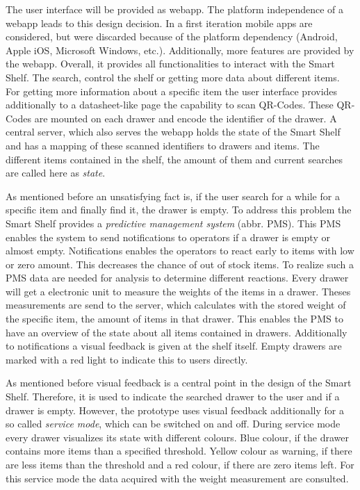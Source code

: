 The user interface will be provided as webapp. 
The platform independence of a webapp leads to this design decision. 
In a first iteration mobile apps are considered, but were discarded because of the platform dependency (Android, Apple iOS, Microsoft Windows, etc.). 
Additionally, more features are provided by the webapp. 
Overall, it provides all functionalities to interact with the Smart Shelf. 
The search, control the shelf or getting more data about different items. 
For getting more information about a specific item the user interface provides additionally to a datasheet-like page the capability to scan QR-Codes. 
These QR-Codes are mounted on each drawer and encode the identifier of the drawer. 
A central server, which also serves the webapp holds the state of the Smart Shelf and has a mapping of these scanned identifiers to drawers and items. 
The different items contained in the shelf, the amount of them and current searches are called here as \textit{state}. 

As mentioned before an unsatisfying fact is, if the user search for a while for a specific item and finally find it, the drawer is empty. 
To address this problem the Smart Shelf provides a \textit{predictive management system} (abbr. PMS). 
This PMS enables the system to send notifications to operators if a drawer is empty or almost empty. 
Notifications enables the operators to react early to items with low or zero amount. 
This decreases the chance of out of stock items. 
To realize such a PMS data are needed for analysis to determine different reactions. 
Every drawer will get a electronic unit to measure the weights of the items in a drawer. 
Theses measurements are send to the server, which calculates with the stored weight of the specific item, the amount of items in that drawer. 
This enables the PMS to have an overview of the state about all items contained in drawers. 
Additionally to notifications a visual feedback is given at the shelf itself. 
Empty drawers are marked with a red light to indicate this to users directly. 

As mentioned before visual feedback is a central point in the design of the Smart Shelf. 
Therefore, it is used to indicate the searched drawer to the user and if a drawer is empty. 
However, the prototype uses visual feedback additionally for a so called \textit{service mode}, which can be switched on and off.
During service mode every drawer visualizes its state with different colours. 
Blue colour, if the drawer contains more items than a specified threshold. 
Yellow colour as warning, if there are less items than the threshold and a red colour, if there are zero items left. 
For this service mode the data acquired with the weight measurement are consulted. 


